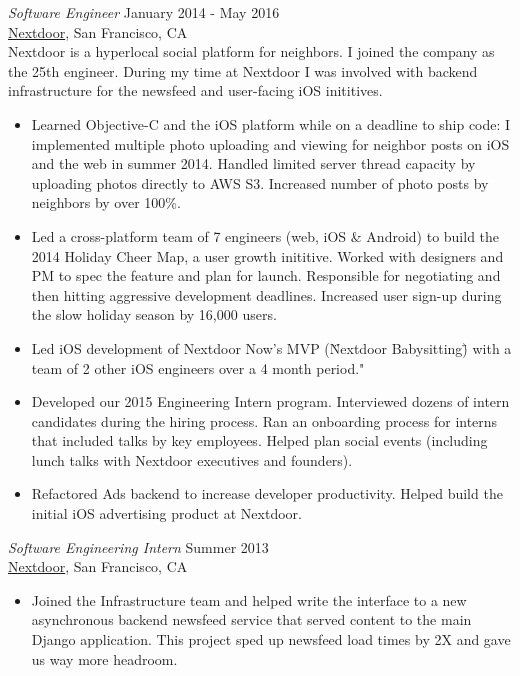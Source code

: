 \documentclass[margin, 10pt]{res} %
\begin{document}
\begin{resume}
{\sl Software Engineer} \hfill January 2014 - May 2016 \\
\href{http://www.nextdoor.com}{Nextdoor}, San Francisco, CA \\
Nextdoor is a hyperlocal social platform for neighbors. I joined the company as the 25th engineer. During my time at Nextdoor I was involved with backend infrastructure for the newsfeed and user-facing iOS inititives. \\
\begin{itemize} \itemsep -2pt %
\item Learned Objective-C and the iOS platform while on a deadline to ship code: I implemented multiple photo uploading and viewing for neighbor posts on iOS and the web in summer 2014. Handled limited server thread capacity by uploading photos directly to AWS S3. Increased number of photo posts by neighbors by over 100\%.
\item Led a cross-platform team of 7 engineers (web, iOS \& Android) to build the 2014 Holiday Cheer Map, a user growth inititive. Worked with designers and PM to spec the feature and plan for launch. Responsible for negotiating and then hitting aggressive development deadlines. Increased user sign-up during the slow holiday season by 16,000 users.
\item Led iOS development of Nextdoor Now's MVP (\"Nextdoor Babysitting\") with a team of 2 other iOS engineers over a 4 month period."
\item Developed our 2015 Engineering Intern program. Interviewed dozens of intern candidates during the hiring process. Ran an onboarding process for interns that included talks by key employees. Helped plan social events (including lunch talks with Nextdoor executives and founders).
\item Refactored Ads backend to increase developer productivity. Helped build the initial iOS advertising product at Nextdoor.
\end{itemize}

{\sl Software Engineering Intern} \hfill Summer 2013 \\
\href{http://www.nextdoor.com}{Nextdoor}, San Francisco, CA
\begin{itemize}
\item Joined the Infrastructure team and helped write the interface to a new asynchronous backend newsfeed service that served content to the main Django application. This project sped up newsfeed load times by 2X and gave us way more headroom.
\end{itemize}


\end{resume}
\end{document}
